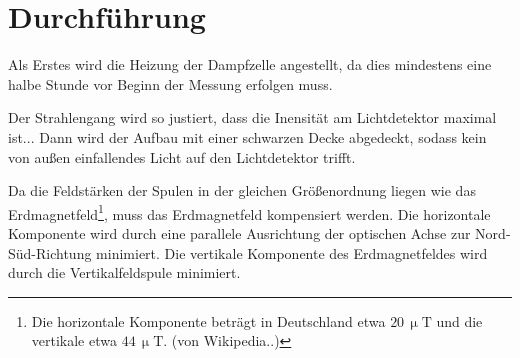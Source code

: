 \section{Durchführung}
Als Erstes wird die Heizung der Dampfzelle angestellt, da dies mindestens eine halbe Stunde vor Beginn der Messung erfolgen muss.

Der Strahlengang wird so justiert, dass die Inensität am Lichtdetektor maximal ist...
Dann wird der Aufbau mit einer schwarzen Decke abgedeckt, sodass kein von außen einfallendes Licht auf den Lichtdetektor trifft.


Da die Feldstärken der Spulen in der gleichen Größenordnung liegen wie das Erdmagnetfeld\footnote{Die horizontale Komponente beträgt in Deutschland etwa $20\,\upmu\text{T}$ und die vertikale etwa $44\,\upmu\text{T}$. (von Wikipedia..)}, muss das Erdmagnetfeld kompensiert werden. Die horizontale Komponente wird durch eine parallele Ausrichtung der optischen Achse zur Nord-Süd-Richtung minimiert. Die vertikale Komponente des Erdmagnetfeldes wird durch die Vertikalfeldspule minimiert.
